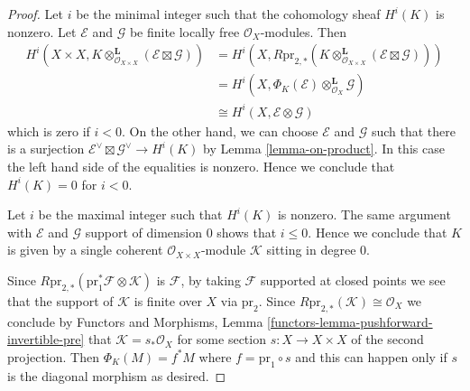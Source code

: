 \documentclass{stacks-project}
\theoremstyle{plain}
\theoremstyle{definition}
\theoremstyle{remark}
\numberwithin{equation}{subsection}
\begin{document}
\begin{proof}
Let $i$ be the minimal integer such that the cohomology sheaf $H^i(K)$ is
nonzero. Let $\mathcal{E}$ and $\mathcal{G}$ be finite locally free
$\mathcal{O}_X$-modules. Then
\begin{align*}
H^i(X \times X, K \otimes_{\mathcal{O}_{X \times X}}^\mathbf{L}
(\mathcal{E} \boxtimes \mathcal{G}))
& =
H^i(X, R\text{pr}_{2, *}(K \otimes_{\mathcal{O}_{X \times X}}^\mathbf{L}
(\mathcal{E} \boxtimes \mathcal{G}))) \\
& =
H^i(X, \Phi_K(\mathcal{E}) \otimes_{\mathcal{O}_X}^\mathbf{L} \mathcal{G}) \\
& \cong
H^i(X, \mathcal{E} \otimes \mathcal{G})
\end{align*}
which is zero if $i < 0$. On the other hand, we can choose
$\mathcal{E}$ and $\mathcal{G}$ such that there is a surjection
$\mathcal{E}^\vee \boxtimes \mathcal{G}^\vee \to H^i(K)$
by Lemma \ref{lemma-on-product}.
In this case the left hand side of the equalities is nonzero.
Hence we conclude that $H^i(K) = 0$ for $i < 0$.

\medskip\noindent
Let $i$ be the maximal integer such that $H^i(K)$ is nonzero.
The same argument with $\mathcal{E}$ and $\mathcal{G}$
support of dimension $0$ shows that $i \leq 0$.
Hence we conclude that $K$ is given by a single coherent
$\mathcal{O}_{X \times X}$-module $\mathcal{K}$ sitting in degree $0$.

\medskip\noindent
Since $R\text{pr}_{2, *}(\text{pr}_1^*\mathcal{F} \otimes \mathcal{K})$
is $\mathcal{F}$, by taking $\mathcal{F}$ supported at closed points
we see that the support of $\mathcal{K}$ is finite over $X$ via
$\text{pr}_2$. Since $R\text{pr}_{2, *}(\mathcal{K}) \cong \mathcal{O}_X$
we conclude by Functors and Morphisms, Lemma
\ref{functors-lemma-pushforward-invertible-pre}
that $\mathcal{K} = s_*\mathcal{O}_X$ for some section $s : X \to X \times X$
of the second projection. Then $\Phi_K(M) = f^*M$ where
$f = \text{pr}_1 \circ s$ and this can happen only if $s$
is the diagonal morphism as desired.
\end{proof}
\end{document}
